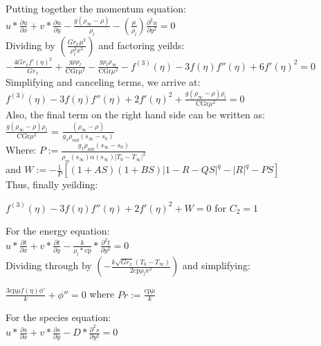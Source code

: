 	\noindent Putting together the momentum equation:\\
	$u*\frac{\partial u}{\partial x}+v*\frac{\partial u}{\partial y}-\frac{g(\rho_\infty -\rho )}{\rho_l}-\left(\frac{\mu }{\rho_l}\right)\frac{\partial^2 u}{\partial y^2} = 0$\\

	\noindent Dividing by $\left(\frac{Gr_x\mu ^2}{ \rho_l^2 x^3}\right)$ and factoring yeilds:\\
	$-\frac{4 Gr_x f'(\eta )^2}{Gr_x}+\frac{g \rho  \rho_l}{\text{CGr} \mu^2}-\frac{g \rho_l \rho_\infty}{\text{CGr} \mu^2}-f^{(3)}(\eta )-3 f(\eta ) f''(\eta )+6 f'(\eta )^2 = 0$\\

	\noindent Simplifying and canceling terms, we arrive at:\\
	$f^{(3)}(\eta )-3 f(\eta ) f''(\eta )+2 f'(\eta )^2 + \frac{g (\rho_\infty - \rho) \rho_l}{\text{CGr} \mu^2} = 0 $\\

	\noindent Also, the final term on the right hand side can be written as:\\ 
	$\frac{g (\rho_\infty - \rho) \rho_l}{\text{CGr} \mu^2}$ = $\frac{(\rho_\infty - \rho)}{g_1 \rho_{m0} (s_\infty - s_0)}$\\ 
 
	\noindent Where: $P := \frac{g_1 \rho_{m0} (s_\infty - s_0)}{\rho_m (s_\infty) \alpha (s_\infty) |T_0 - T_\infty|^2}$\\ 
	and $W := -\frac{1}{P}\left[ (1+AS)(1+BS)|1-R-QS|^q-|R|^q-PS\right]$\\

	Thus, finally yeilding:\\
	\begin{center}
		$f^{(3)}(\eta )-3 f(\eta ) f''(\eta )+2 f'(\eta )^2 + W = 0 $ for $C_2 = 1$
	\end{center}

	\noindent For the energy equation:\\
	$u*\frac{\partial t}{\partial x}+v*\frac{\partial t}{\partial y}-\frac{k}{\rho_l*\text{cp}}*\frac{\partial^2 t}{\partial y^2} = 0$\\

	\noindent Dividing through by $\left(-\frac{k \sqrt{Gr_x} (T_0-T_\infty)}{2 \text{cp} \rho_l x^2}\right)$ and simplifying:\\
	\begin{center}
		$\frac{3 \text{cp} \mu  f(\eta ) \phi'}{k}+\phi'' = 0$ where $Pr := \frac{\text{cp} \mu}{k}$\\
	\end{center}
	For the species equation:\\
	$u*\frac{\partial s}{\partial x}+v*\frac{\partial s}{\partial y}-D*\frac{\partial^2 s}{\partial y^2} = 0$\\

